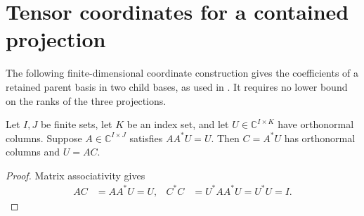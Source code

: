 \section{Tensor coordinates for a contained projection}
\label{sec:projection_tensor_coordinates}

The following finite-dimensional coordinate construction gives the coefficients
of a retained parent basis in two child bases, as used in
\cite[Section~III, lines 630--685]{Hastings2006Solving}. It requires no lower
bound on the ranks of the three projections.

\begin{theorem}
    \label{thm:projection_coordinate_factorization}
    \leanok
    Let $I,J$ be finite sets, let $K$ be an index set, and let
    $U\in\mathbb C^{I\times K}$ have orthonormal columns. Suppose
    $A\in\mathbb C^{I\times J}$ satisfies $AA^*U=U$. Then $C=A^*U$
    has orthonormal columns and $U=AC$.
\end{theorem}
\begin{proof}\leanok
    Matrix associativity gives
    \begin{align}
        AC&=AA^*U=U,&
        C^*C&=U^*AA^*U=U^*U=I.
        \label{eq:projection_tensor_coefficients}
    \end{align}
\end{proof}

